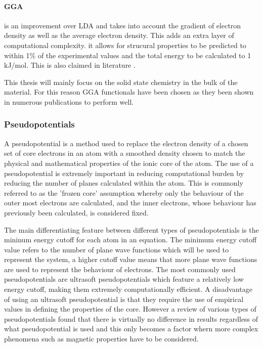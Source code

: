 \paragraph{GGA} is an improvement over LDA and takes into account the gradient of electron density as well as the average electron density. This adds an extra layer of computational complexity. it allows for strucural properties to be predicted to within 1\% of the experimental values and the total energy to be calculated to 1 kJ/mol. \cite{dftbook1} This is also claimed in literature \cite{Olsen2003}.

This thesis will mainly focus on the solid state chemistry in the bulk of the material. For this reason GGA functionals have been chosen as they been shown in numerous publications to perform well. 

\subsubsection{Pseudopotentials}
A pseudopotential is a method used to replace the electron density of a chosen set of core electrons in an atom with a smoothed density chosen to match the physical and mathematical properties of the ionic core of the atom. \cite{dftbook1} The use of a pseudopotential is extremely important in reducing computational burden by reducing the number of planes calculated within the atom. This is commonly referred to as the 'frozen core' assumption whereby only the behaviour of the outer most electrons are calculated, and the inner electrons, whose behaviour has previously been calculated, is considered fixed. \cite{dftbook1}

The main differentiating feature between different types of pseudopotentials is the mininum energy cutoff for each atom in an equation. The minimum energy cutoff value refers to the number of plane wave functions which will be used to represent the system, a higher cutoff value means that more plane wave functions are used to represent the behaviour of electrons. The most commonly used pseudopotentials are ultrasoft pseudopotentials which feature a relatively low energy cutoff, making them extremely computationally efficient. A disadvantage of using an ultrasoft pseudopotential is that they require the use of empirical values in defining the properties of the core. However a review of various types of pseudopotentials found that there is virtually no difference in results regardless of what pseudopotential is used and this only becomes a factor whern more complex phenomena such as magnetic properties have to be considered. \cite{dftbook1}

